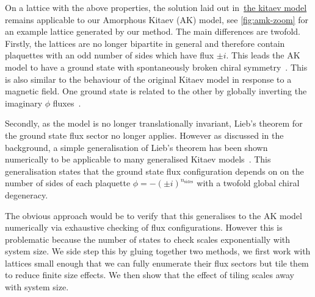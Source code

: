On a lattice with the above properties, the solution laid out in~\protect\hyperlink{bg-hkm-model}{the kitaev model} remains applicable to our Amorphous Kitaev (AK) model, see \cref{fig:amk-zoom} for an example lattice generated by our method. The main differences are twofold. Firstly, the lattices are no longer bipartite in general and therefore contain plaquettes with an odd number of sides which have flux \(\pm i\). This leads the AK model to have a ground state with spontaneously broken chiral symmetry~\autocite{Chua2011,yaoExactChiralSpin2007,ChuaPRB2011,Fiete2012,Natori2016,Wu2009,Peri2020,WangHaoranPRB2021}. This is also similar to the behaviour of the original Kitaev model in response to a magnetic field. One ground state is related to the other by globally inverting the imaginary \(\phi\) fluxes~\autocite{yaoExactChiralSpin2007}.

Secondly, as the model is no longer translationally invariant, Lieb's theorem for the ground state flux sector no longer applies. However as discussed in the background, a simple generalisation of Lieb's theorem has been shown numerically to be applicable to many generalised Kitaev models~\autocite{eschmannThermodynamicClassificationThreedimensional2020,Yao2009,eschmann2019thermodynamics,Peri2020}. This generalisation states that the ground state flux configuration depends on on the number of sides of each plaquette \(\phi = -(\pm i)^{n_{\mathrm{sides}}}\) with a twofold global chiral degeneracy.

The obvious approach would be to verify that this generalises to the AK model numerically via exhaustive checking of flux configurations. However this is problematic because the number of states to check scales exponentially with system size. We side step this by gluing together two methods, we first work with lattices small enough that we can fully enumerate their flux sectors but tile them to reduce finite size effects. We then show that the effect of tiling scales away with system size.

